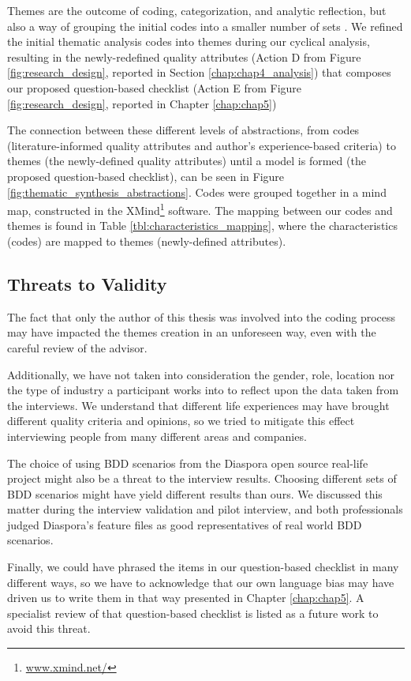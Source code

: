 Themes are the outcome of coding, categorization, and analytic reflection, but also a way of grouping the initial codes into a smaller number of sets \cite{2011_Cruzes_and_Dyba}. We refined the initial thematic analysis codes into themes during our cyclical analysis, resulting in the newly-redefined quality attributes (Action D from Figure \ref{fig:research_design}, reported in Section \ref{chap:chap4_analysis}) that composes our proposed question-based checklist (Action E from Figure \ref{fig:research_design}, reported in Chapter \ref{chap:chap5})

The connection between these different levels of abstractions, from codes (literature-informed quality attributes and author's experience-based criteria) to themes (the newly-defined quality attributes) until a model is formed (the proposed question-based checklist), can be seen in Figure \ref{fig:thematic_synthesis_abstractions}. Codes were grouped together in a mind map, constructed in the XMind\footnote{\url{www.xmind.net/}} software. The mapping between our codes and themes is found in Table \ref{tbl:characteristics_mapping}, where the characteristics (codes) are mapped to themes (newly-defined attributes).

\subsection{Threats to Validity}

The fact that only the author of this thesis was involved into the coding process may have impacted the themes creation in an unforeseen way, even with the careful review of the advisor. 

Additionally, we have not taken into consideration the gender, role, location nor the type of industry a participant works into to reflect upon the data taken from the interviews. We understand that different life experiences may have brought different quality criteria and opinions, so we tried to mitigate this effect interviewing people from many different areas and companies. 

The choice of using BDD scenarios from the Diaspora open source real-life project might also be a threat to the interview results. Choosing different sets of BDD scenarios might have yield different results than ours. We discussed this matter during the interview validation and pilot interview, and both professionals judged Diaspora's feature files as good representatives of real world BDD scenarios. 

Finally, we could have phrased the items in our question-based checklist in many different ways, so we have to acknowledge that our own language bias may have driven us to write them in that way presented in Chapter \ref{chap:chap5}. A specialist review of that question-based checklist is listed as a future work to avoid this threat.